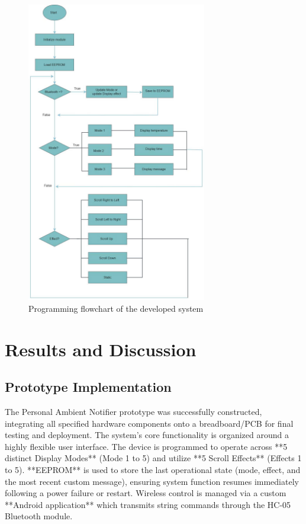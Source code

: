 \documentclass[a4paper, 10pt]{article}
\begin{document}
	\begin{figure}[htbp]
		\centering
		\includegraphics[width=0.7\textwidth]{flowchart.png}
		\caption{Programming flowchart of the developed system}
		\label{fig:flowchart}
	\end{figure}
	
	\section{Results and Discussion}
	
	\subsection{Prototype Implementation}
	The Personal Ambient Notifier prototype was successfully constructed, integrating all specified hardware components onto a breadboard/PCB for final testing and deployment. The system's core functionality is organized around a highly flexible user interface. The device is programmed to operate across **5 distinct Display Modes** (Mode 1 to 5) and utilize **5 Scroll Effects** (Effects 1 to 5). **EEPROM** is used to store the last operational state (mode, effect, and the most recent custom message), ensuring system function resumes immediately following a power failure or restart. Wireless control is managed via a custom **Android application** which transmits string commands through the HC-05 Bluetooth module.
	
\end{document}
